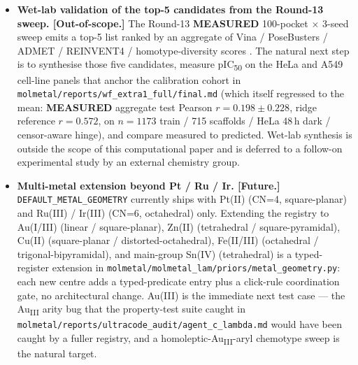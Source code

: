 \begin{itemize}
\begin{enumerate}
            Closest existing results are
            \cite{karczewski2024egnn, neyshabur2017spectralnorm};
            neither closes the per-pocket learnability question
            under the scaffold-group split of
            \cite{ertl2018scaffold, bemis1996murcko} that
            \S\ref{sec:evaluation:protocol} mandates.
    \end{enumerate}
    Each of the five is a theorem-level research question, not
    a code-level follow-up; the CFM-side §3.5 deferral buys the
    room to frame them honestly as paper contributions. These
    five gaps are listed again in the §3 method deferral
    paragraph (\S\ref{sec:method:secondary-cfm}) and the §6
    limitations list (\S\ref{sec:limitations}, item 1).

  \item \textbf{Wet-lab validation of the top-5 candidates from the Round-13 sweep.
    [Out-of-scope.]} The Round-13 \textbf{MEASURED} 100-pocket $\times$ 3-seed
    sweep emits a top-5 list ranked by an aggregate of Vina / PoseBusters /
    ADMET / REINVENT4 / homotype-diversity scores
    \cite{footnote:wf_lambda1c}.  The natural next step is to synthesise
    those five candidates, measure pIC\textsubscript{50} on the HeLa and
    A549 cell-line panels that anchor the calibration cohort in
    \texttt{molmetal/reports/wf\_extra1\_full/final.md} (which itself
    regressed to the mean: \textbf{MEASURED} aggregate test Pearson
    $r = 0.198 \pm 0.228$, ridge reference $r = 0.572$, on $n=1173$
    train / 715 scaffolds / HeLa 48\,h dark / censor-aware hinge), and
    compare measured to predicted.  Wet-lab synthesis is outside the
    scope of this computational paper and is deferred to a follow-on
    experimental study by an external chemistry group.

  \item \textbf{Multi-metal extension beyond Pt / Ru / Ir.
    [Future.]} \texttt{DEFAULT\_METAL\_GEOMETRY} currently ships with
    Pt(II) (CN=4, square-planar) and Ru(III) / Ir(III) (CN=6,
    octahedral) only.  Extending the registry to Au(I/III) (linear /
    square-planar), Zn(II) (tetrahedral / square-pyramidal),
    Cu(II) (square-planar / distorted-octahedral), Fe(II/III)
    (octahedral / trigonal-bipyramidal), and main-group Sn(IV)
    (tetrahedral) is a typed-register extension in
    \texttt{molmetal/molmetal\_lam/priors/metal\_geometry.py}: each
    new centre adds a typed-predicate entry plus a click-rule
    coordination gate, no architectural change.  Au(III) is the
    immediate next test case --- the Au\textsubscript{III} arity bug
    that the property-test suite caught in
    \texttt{molmetal/reports/ultracode\_audit/agent\_c\_lambda.md}
    would have been caught by a fuller registry, and a
    homoleptic-Au\textsubscript{III}-aryl chemotype sweep is the
    natural target.


\end{itemize}
